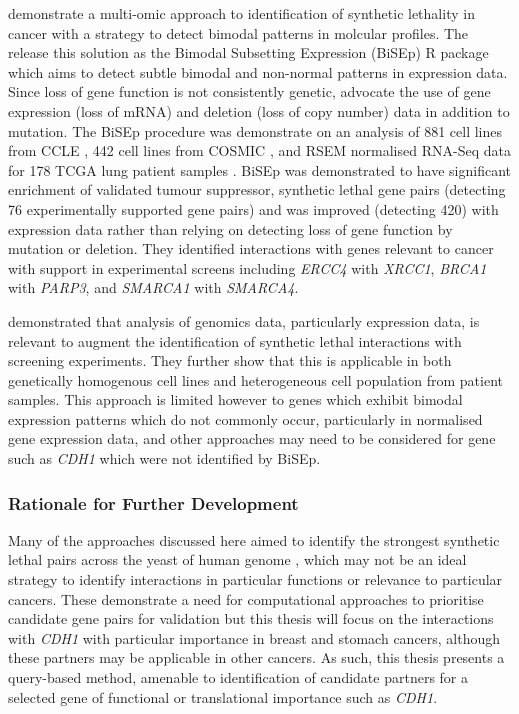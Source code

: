 \citet{Wappett2016} demonstrate a multi-omic approach to identification of synthetic lethality in cancer with a strategy to detect bimodal patterns in molcular profiles. The release this solution as the Bimodal Subsetting Expression (BiSEp) R package \citet{Wappett2014} which aims to detect subtle bimodal and non-normal patterns in expression data. Since loss of gene function is not consistently genetic, \citet{Wappett2016} advocate the use of gene expression (loss of mRNA) and deletion (loss of copy number) data in addition to mutation. The BiSEp procedure was demonstrate on an analysis of 881 cell lines from CCLE \citep{Barretina2012}, 442 cell lines from COSMIC \citep{Forbes2015}, and RSEM normalised RNA-Seq data for 178 TCGA lung patient samples \citep{TCGA2014LU}. BiSEp was demonstrated to have significant enrichment of validated tumour suppressor, synthetic lethal gene pairs (detecting 76 experimentally supported gene pairs) and was improved (detecting 420) with expression data rather than relying on detecting loss of gene function by mutation or deletion. They identified interactions with genes relevant to cancer with support in experimental screens including \textit{ERCC4} with \textit{XRCC1}, \textit{BRCA1} with \textit{PARP3}, and \textit{SMARCA1} with \textit{SMARCA4}.

\citet{Wappett2016} demonstrated that analysis of genomics data, particularly expression data, is relevant to augment the identification of synthetic lethal interactions with screening experiments. They further show that this is applicable in both genetically homogenous cell lines and heterogeneous cell population from patient samples. This approach is limited however to genes which exhibit bimodal expression patterns which do not commonly occur, particularly in normalised gene expression data, and other approaches may need to be considered for gene such as \textit{CDH1} which were not identified by BiSEp.

\subsubsection{Rationale for Further Development}

Many of the approaches discussed here aimed to identify the strongest synthetic lethal pairs across the yeast of human genome \citep{Lu2015, Wappett2016, Deshpande2013, Wu2014}, which may not be an ideal strategy to identify interactions in particular functions or relevance to particular cancers. These demonstrate a need for computational approaches to prioritise candidate gene pairs for validation but this thesis will focus on the interactions with \textit{CDH1} with particular importance in breast and stomach cancers, although these partners may be applicable in other cancers. As such, this thesis presents a query-based method, amenable to identification of candidate partners for a selected gene of functional or translational importance such as \textit{CDH1}.

